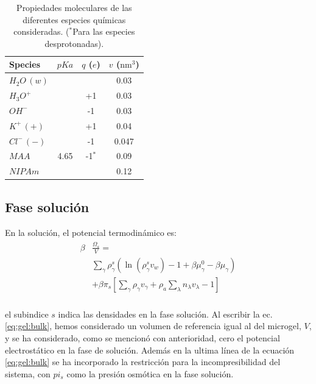\begin{table}
	\centering
\begin{tabular}{|lccc|}
    \hline
    {Species} & {$pKa$} & {$q$ ($e$)} & {$v$ ($\text{nm}^3$)} \\
      \hline
$H_2O\,(w)$ & ~ & ~ & 0.03\\
$H_3O^+$ & ~ & +1 & 0.03\\
$OH^-$ & ~ & -1 & 0.03\\
$K^+\,(+)$ & ~ & +1 & 0.04\\ 
$Cl^-\,(-)$ & ~ & -1 & 0.047\\
$MAA$ & 4.65 & -1$^\ast$ & 0.09\\
$NIPAm$ & ~ & ~ & 0.12\\
    \hline
  \end{tabular}
 \caption{Propiedades moleculares de las diferentes especies qu\'imicas consideradas.
 	\footnotesize ($^\ast$Para las especies desprotonadas).}
\label{table:gel:molecules} 
\end{table}


\subsection{Fase soluci\'on}\label{sec:gel:fase-solucion}

En la soluci\'on, el potencial termodin\'amico es:
%
%
\begin{align}
\begin{aligned}
\beta&\frac{\Omega_s}{V}=\\& \sum_{\gamma   } {\rho^s_\gamma\left(\ln(\rho_\gamma^sv_w) -1 + \beta\mu_\gamma^0 - \beta\mu_\gamma\right)} \\
& +\beta\pi_{s} \left[ \sum_{\gamma } \rho_\gamma v_\gamma + \rho_a \sum_\lambda n_\lambda v_\lambda -1 \right] \\
\end{aligned}
\label{eq:gel:bulk}
\end{align}

\noindent el subindice  $s$  indica las densidades en la fase soluci\'on.
Al escribir la ec. \ref{eq:gel:bulk}, hemos considerado un volumen de referencia igual al del microgel, $V$, y se ha considerado, como se mencion\'o con anterioridad, cero el potencial electrost\'atico en la fase de soluci\'on.
Adem\'as en la ultima l\'inea de la ecuaci\'on \ref{eq:gel:bulk} se ha incorporado la restricci\'on para la incompresibilidad del sistema, con $pi_s$ como la presi\'on osm\'otica en la fase soluci\'on.

